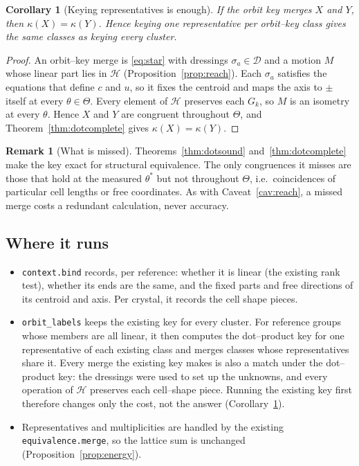 \documentclass[11pt]{article}
\newtheorem{corollary}[theorem]{Corollary}
\theoremstyle{definition}
\newtheorem{remark}[theorem]{Remark}
\newcommand{\Hgrp}{\mathcal{H}}
\newcommand{\Dgrp}{\mathcal{D}}
\begin{document}
\begin{corollary}[Keying representatives is enough]\label{cor:dotreps}
If the orbit key merges $X$ and $Y$, then $\kappa(X)=\kappa(Y)$. Hence keying
one representative per orbit--key class gives the same classes as keying every
cluster.
\end{corollary}

\begin{proof}
An orbit--key merge is \eqref{eq:star} with dressings $\sigma_a\in\Dgrp$ and a
motion $M$ whose linear part lies in $\Hgrp$ (Proposition~\ref{prop:reach}).
Each $\sigma_a$ satisfies the equations that define $c$ and $u$, so it fixes
the centroid and maps the axis to $\pm$ itself at every $\theta\in\Theta$.
Every element of $\Hgrp$ preserves each $G_k$, so $M$ is an isometry at every
$\theta$. Hence $X$ and $Y$ are congruent throughout $\Theta$, and
Theorem~\ref{thm:dotcomplete} gives $\kappa(X)=\kappa(Y)$.
\end{proof}

\begin{remark}[What is missed]
Theorems~\ref{thm:dotsound} and~\ref{thm:dotcomplete} make the key exact for
structural equivalence. The only congruences it misses are those that hold at
the measured $\theta^\ast$ but not throughout $\Theta$, i.e.\ coincidences of
particular cell lengths or free coordinates. As with Caveat~\ref{cav:reach},
a missed merge costs a redundant calculation, never accuracy.
\end{remark}

\subsection{Where it runs}

\begin{itemize}[leftmargin=2em]
\item \texttt{context.bind} records, per reference: whether it is linear (the
  existing rank test), whether its ends are the same, and the fixed parts and
  free directions of its centroid and axis. Per crystal, it records the cell
  shape pieces.
\item \texttt{orbit\_labels} keeps the existing key for every cluster. For
  reference groups whose members are all linear, it then computes the
  dot--product key for one representative of each existing class and merges
  classes whose representatives share it. Every merge the existing key makes is
  also a match under the dot--product key: the dressings were used to set up
  the unknowns, and every operation of $\Hgrp$ preserves each cell--shape piece.
  Running the existing key first therefore changes only the cost, not the
  answer (Corollary~\ref{cor:dotreps}).
\item Representatives and multiplicities are handled by the existing
  \texttt{equivalence.merge}, so the lattice sum is unchanged
  (Proposition~\ref{prop:energy}).
\end{itemize}
\end{document}

